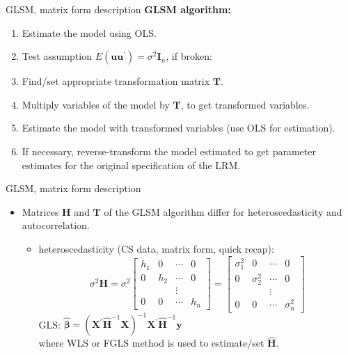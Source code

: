\documentclass{beamer}
\begin{document}
\begin{frame}{GLSM, matrix form description}
\textbf{GLSM algorithm:} \\ \medskip
\begin{enumerate}
\item Estimate the model using OLS.
\item Test assumption $E(\boldsymbol{uu}^{\prime})=\sigma^2 \boldsymbol{I}_n$, if  broken:
\item Find/set appropriate transformation matrix $\boldsymbol{T}$.
\item Multiply variables of the model by $\boldsymbol{T}$, to get transformed variables.
\item Estimate the model with transformed variables (use OLS for estimation).
\item If necessary, reverse-transform the model estimated to get parameter estimates for the original specification of the LRM.
\end{enumerate}
\end{frame}
\begin{frame}{GLSM, matrix form description}
\begin{itemize}
\item Matrices $\boldsymbol{H}$ and $\boldsymbol{T}$ of the GLSM algorithm differ for heteroscedasticity  and autocorrelation.
\vspace{0.2cm}
\begin{itemize}
\item heteroscedasticity (CS data, matrix form, quick recap):\\
$$\sigma^2 \bm{H} = \sigma^2 
\begin{bmatrix}
    h_1&  0 & \cdots & 0\\
    0 &  h_2&  \cdots & 0\\ 
     &    &  \vdots& \\ 
     0 & 0 & \cdots & h_n 
\end{bmatrix} = 
\begin{bmatrix}
    \sigma^2_1&  0 & \cdots & 0\\
    0 &  \sigma^2_2&  \cdots & 0\\ 
     &    &  \vdots& \\ 
     0 & 0 & \cdots & \sigma^2_n 
\end{bmatrix}
$$
GLS: $\bm{\hat{\beta}}=(\bm{X}^{\prime} \bm{\hat{H}}^{-1} \bm{X})^{-1} \bm{X}^{\prime} \bm{\hat{H}}^{-1} \bm{y}$\\
where WLS or FGLS method is used to estimate/set $\bm{\hat{H}}$.
\end{itemize}
\end{itemize}
\end{frame}
\end{document}

